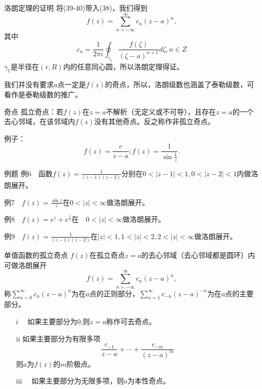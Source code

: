 \documentclass[11pt]{beamer}
\newcommand{\kong}[1][0.5]{\vspace{#1cm}}
\begin{document}
\begin{frame}{洛朗定理的证明}
将(39-40)带入(38)，我们得到
\begin{equation}
f(z) = \sum_{n=-\infty}^{\infty} c_n (z-a)^n,
\end{equation}
其中
\begin{equation}
c_n = \frac{1}{2\pi i} \oint_{\gamma_1} \frac{f(\zeta)}{(\zeta-a)^{n+1}} d\zeta, n \in Z
\end{equation}
$\gamma_1$是半径在$(r,R)$内的任意同心圆，所以洛朗定理得证。

\kong[1]
我们并没有要求$a$点一定是$f(z)$的奇点，所以，洛朗级数也涵盖了泰勒级数，可看作是泰勒级数的推广。
\end{frame}

\begin{frame}{奇点}
孤立奇点：若$f(z)$在$z=a$不解析（无定义或不可导），且存在$z=a$的一个去心邻域，在该邻域内$f(z)$没有其他奇点。反之称作非孤立奇点。

\kong[1]
例子：
\begin{equation}
f(z) = \frac{c}{z-a}; f(z) = \frac{1}{\sin \frac{1}{z}}.
\end{equation}
\end{frame}

\begin{frame}{例题}
例6　函数$f(z) = \frac{1}{(z-1)(z-2)}$分别在$0<|z-1|<1, 0<|z-2|<1$内做洛朗展开。

\kong[0.5]
例7　$f(z) = \frac{\sin z}{z}$在$0<|z|<\infty$做洛朗展开。

\kong[0.5]
例8　$f(z) = e^z + e^{\frac{1}{z}}$在　$0<|z|<\infty$做洛朗展开。

\kong[0.5]
例9　$f(z) = \frac{1}{(z-1)(z-2)}$在$|z|<1, 1<|z|<2, 2<|z|<\infty$做洛朗展开。
\end{frame}

\begin{frame}{单值函数的孤立奇点}
$f(z)$在孤立奇点$z=a$的去心邻域（去心邻域都是圆环）内可做洛朗展开
\begin{equation}
f(z) = \sum_{n=-\infty}^{\infty} c_n (z-a)^n,
\end{equation}
称$\sum_{n=0}^{\infty}c_n (z-a)^n$为在$a$点的正则部分，$\sum_{n=1}^{\infty}c_{-n}(z-a)^{-n}$为在$a$点的主要部分。
\begin{itemize}
	\item [i]　如果主要部分为0,则$z=a$称作可去奇点。
	\item [ii] 如果主要部分为有限多项
	\begin{equation}
	\frac{c_{-1}}{z-a} + \cdots + \frac{c_{-m}}{(z-a)^m}
	\end{equation}
	则$a$为$f(z)$的$m$阶极点。
	\item [iii]　如果主要部分为无限多项，则$a$为本性奇点。
\end{itemize}
\end{frame}
\end{document}
